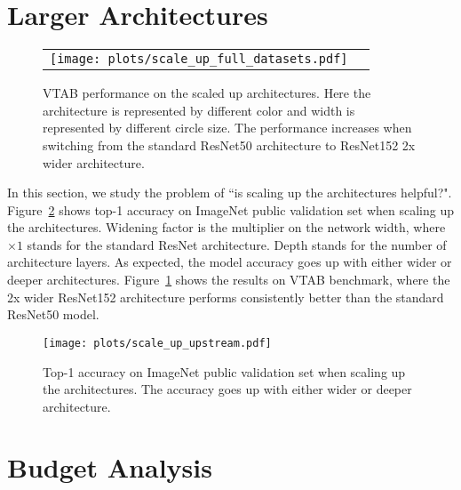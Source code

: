 \documentclass{article}
\newcommand{\imagenet}{ImageNet}
\begin{document}
\clearpage
\section{Larger Architectures\label{app:scale-architecture}}

\begin{minipage}{\textwidth}
\begin{figure}[H]
    \centering
    \begin{tabular}{cc}
    \texttt{[image: plots/scale\_up\_full\_datasets.pdf]}
    \end{tabular}
    \caption{
    VTAB performance on the scaled up architectures.
    Here the architecture is represented by different color and width is represented by different circle size.
    The performance increases when switching from the standard ResNet50 architecture to ResNet152 2x wider architecture.}
    \label{fig:scale-up-downstream}
\end{figure}
\end{minipage}

In this section, we study the problem of ``is scaling up the architectures helpful?". Figure~\ref{fig:scale-up-upstream} shows top-1 accuracy on \imagenet{} public validation set when scaling up the architectures. 
Widening factor is the multiplier on the network width, where $\times 1$ stands for the standard ResNet architecture.
Depth stands for the number of architecture layers. 
As expected, the model accuracy goes up with either wider or deeper architectures. 
Figure~\ref{fig:scale-up-downstream} shows the results on VTAB benchmark, where the 2x wider ResNet152 architecture performs consistently better than the standard ResNet50 model. 

\begin{figure}[ht]
    \centering
    \texttt{[image: plots/scale\_up\_upstream.pdf]}
    \caption{Top-1 accuracy on \imagenet{} public validation set when scaling up the architectures. The accuracy goes up with either wider or deeper architecture. 
    }
    \label{fig:scale-up-upstream}
\end{figure}




\clearpage
\section{Budget Analysis\label{app:budget}}
\end{document}
